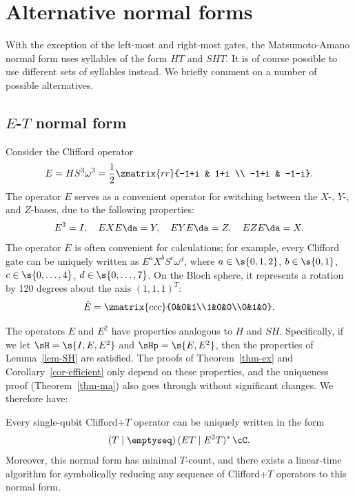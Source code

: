 \documentclass{article}
\begin{document}
\section{Alternative normal forms}

With the exception of the left-most and right-most gates, the
Matsumoto-Amano normal form uses syllables of the form $HT$ and
$SHT$. It is of course possible to use different sets of syllables
instead. We briefly comment on a number of possible alternatives.

\subsection{$E$-$T$ normal form}

Consider the Clifford operator
\[ E = HS^3\omega^3 = \frac{1}{2}\zmatrix{rr}{-1+i & 1+i \\ -1+i & -1-i}.
\]
The operator $E$ serves as a convenient operator for switching between
the $X$-, $Y$-, and $Z$-bases, due to the following properties:
\[ E^3 = I,
\quad EXE\da = Y,
\quad EYE\da = Z,
\quad EZE\da = X.
\]
The operator $E$ is often convenient for calculations; for example,
every Clifford gate can be uniquely written as $E^aX^bS^c\omega^d$,
where $a\in\s{0,1,2}$, $b\in\s{0,1}$, $c\in\s{0,\ldots,4}$,
$d\in\s{0,\ldots,7}$.  On the Bloch sphere, it represents a rotation
by 120 degrees about the axis $(1,1,1)^T$:
\[ \hat E = \zmatrix{ccc}{0&0&1\\1&0&0\\0&1&0}.
\]

The operators $E$ and $E^2$ have properties analogous to $H$ and $SH$.
Specifically, if we let $\sH = \s{I,E,E^2}$ and $\sHp = \s{E,E^2}$,
then the properties of Lemma~\ref{lem-SH} are satisfied. The proofs of
Theorem~\ref{thm-ex} and Corollary~\ref{cor-efficient} only
depend on these properties, and the uniqueness proof
(Theorem~\ref{thm-ma}) also goes through without significant
changes. We therefore have:

\begin{proposition}
  Every single-qubit Clifford+$T$ operator can be uniquely written in
  the form
  \begin{equation}\label{eqn-et}
    (T\mid\emptyseq)\,(ET\mid E^2T)^*\,{\cC}.
  \end{equation}
  Moreover, this normal form has minimal $T$-count, and there exists a
  linear-time algorithm for symbolically reducing any sequence of
  Clifford+$T$ operators to this normal form.
\end{proposition}
\end{document}
